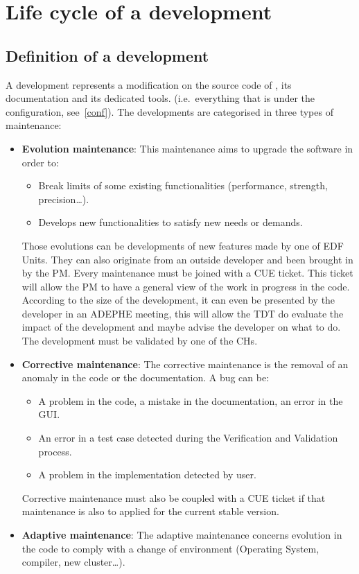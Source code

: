 \section{Life cycle of a development}

\subsection{Definition of a development}
\label{defdev}

A development represents a modification on the source code of \telemacsystem{},
its documentation and its dedicated tools. (i.e.\ everything that is under the
configuration, see~\ref{conf}). The developments are categorised in three types
of maintenance:
\begin{itemize}
\item \textbf{Evolution maintenance}: This maintenance aims to upgrade the
  software in order to:
  \begin{itemize}
  \item Break limits of some existing functionalities (performance, strength,
    precision\ldots).
  \item Develops new functionalities to satisfy new needs or demands.
  \end{itemize}
  Those evolutions can be developments of new features made by one of EDF Units.
  They can also originate from an outside developer and been brought in by the
  PM\@.
  Every maintenance must be joined with a CUE ticket. This ticket will allow
  the PM to have a general view of the work in progress in the code. According
  to the size of the development, it can even be presented by the developer in
  an ADEPHE meeting, this will allow the TDT do evaluate the impact of the
  development and maybe advise the developer on what to do. The development
  must be validated by one of the CHs.
\item \textbf{Corrective maintenance}: The corrective maintenance is the
  removal of an anomaly in the code or the documentation. A bug can be:
  \begin{itemize}
  \item A problem in the code, a mistake in the documentation, an error in the
    GUI\@.
  \item An error in a test case detected during the Verification and Validation
    process.
  \item A problem in the implementation detected by user.
  \end{itemize}
  Corrective maintenance must also be coupled with a CUE ticket if that
  maintenance is also to applied for the current stable version.
\item \textbf{Adaptive maintenance}: The adaptive maintenance concerns
  evolution in the code to comply with a change of environment (Operating
  System, compiler, new cluster\ldots).
\end{itemize}

